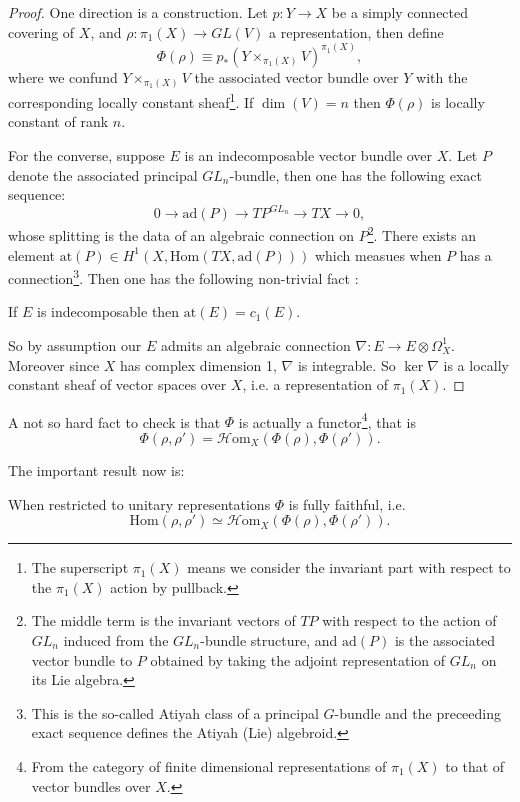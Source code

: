 \begin{proof}
One direction is a construction. Let $p: Y \rightarrow X$ be a simply connected covering
of $X$, and $\rho: \pi_1(X) \rightarrow GL(V)$ a representation, then define 
\[\Phi(\rho) \equiv p_{*}\left(Y\times_{\pi_1(X)}V\right)^{\pi_1(X)},\]
where we confund $Y\times_{\pi_1(X)}V$ the associated vector bundle over $Y$
with the corresponding locally constant sheaf\footnote{The superscript $\pi_1(X)$
means we consider the invariant part with respect to the $\pi_1(X)$ action by
pullback.}. If $\dim(V) = n$ then $\Phi(\rho)$ is locally constant of
rank $n$.

For the converse, suppose $E$ is an indecomposable vector bundle
over $X$. Let $P$ denote the associated principal $GL_n$-bundle, then
one has the following exact sequence:
\[0 \rightarrow \mbox{ad}(P) \rightarrow TP^{GL_n} \rightarrow TX \rightarrow 0,\]
whose splitting is the data of an algebraic connection on $P$\footnote{The
middle term is the invariant vectors of $TP$ with respect to the
action of $GL_n$ induced from the $GL_n$-bundle structure, and
$\mbox{ad}(P)$ is the associated vector bundle to $P$ obtained by
taking the adjoint representation of $GL_n$ on its Lie algebra.}. There
exists an element $\mbox{at}(P) \in H^1(X,\mbox{Hom}(TX,\mbox{ad}(P)))$ which
measues when $P$ has a connection\footnote{This is the so-called
  Atiyah class of a principal $G$-bundle and the preceeding exact
  sequence defines the Atiyah (Lie) algebroid.}.
Then one has the following non-trivial fact \cite[Section 5]{A}:
\begin{lem}
If $E$ is indecomposable then $\mbox{at}(E) = c_1(E)$.
\end{lem}
So by assumption our $E$ admits an algebraic connection
$\nabla: E \rightarrow E\otimes\Omega^1_X$. Moreover since $X$ has complex
dimension 1, $\nabla$ is integrable. So $\ker \nabla$ is a locally
constant sheaf of vector spaces over $X$, i.e. a representation of
$\pi_1(X)$.
\end{proof}

A not so hard fact to check is that $\Phi$ is actually a
functor\footnote{From the category of finite dimensional
  representations of $\pi_1(X)$ to that of vector bundles over $X$.}, that is
\[\Phi\left(\rho,\rho'\right) = \mathcal{H}\mbox{om}_X(\Phi(\rho),\Phi(\rho')).\]

The important result now is:
\begin{lem} 
When restricted to unitary representations $\Phi$ is fully faithful,
i.e.
\[\mbox{Hom}(\rho,\rho') \simeq \mathcal{H}\mbox{om}_X(\Phi(\rho),\Phi(\rho')).\]
\end{lem}


